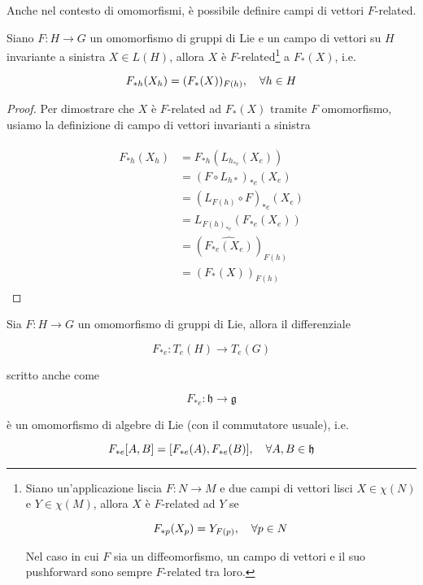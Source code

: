 Anche nel contesto di omomorfismi, è possibile definire campi di vettori $ F $-related.

\begin{definition}[2]
	Siano $ F : H \to G $ un omomorfismo di gruppi di Lie e un campo di vettori su $ H $ invariante a sinistra $ X \in L(H) $, allora $ X $ è $ F $-related\footnote{%
		Siano un'applicazione liscia $ F : N \to M $ e due campi di vettori lisci $ X \in \chi(N) $ e $ Y \in \chi(M) $, allora $ X $ è $ F $-related ad $ Y $ se
		
		\begin{equation}
			F_{*p} (X_{p}) = Y_{F(p)} \qcomma \forall p \in N
		\end{equation}
	
		Nel caso in cui $ F $ sia un diffeomorfismo, un campo di vettori e il suo pushforward sono sempre $ F $-related tra loro.%
	} a $ F_{*}(X) $, i.e.

	\begin{equation}
		F_{*h} (X_{h}) = (F_{*}(X))_{F(h)} \qcomma \forall h \in H
	\end{equation}
\end{definition}

\begin{proof}
	Per dimostrare che $ X $ è $ F $-related ad $ F_{*}(X) $ tramite $ F $ omomorfismo, usiamo la definizione di campo di vettori invarianti a sinistra
	
	\begin{align}
		\begin{split}
			F_{*h} (X_{h}) &= F_{*h} (L_{h_{*e}}(X_{e}))\\
			&= (F \circ L_{h*})_{*e} (X_{e})\\
			&= (L_{F(h)} \circ F)_{*e} (X_{e})\\
			&= L_{F(h)_{*e}} (F_{*e}(X_{e}))\\
			&= (\widehat{ F_{*e}(X_{e}) })_{F(h)}\\
			&= (F_{*}(X))_{F(h)}
		\end{split}
	\end{align}
\end{proof}

\begin{definition}[3]
	Sia $ F : H \to G $ un omomorfismo di gruppi di Lie, allora il differenziale
	
	\begin{equation}
		F_{*e} : T_{e}(H) \to T_{e}(G)
	\end{equation}

	scritto anche come
	
	\begin{equation}
		F_{*e} : \mathfrak{h} \to \mathfrak{g}
	\end{equation}

	è un omomorfismo di algebre di Lie (con il commutatore usuale), i.e.
	
	\begin{equation}
		F_{*e} \comm{A}{B} = \comm{F_{*e} (A)}{F_{*e} (B)} \qcomma \forall A,B \in \mathfrak{h}
	\end{equation}
\end{definition}

